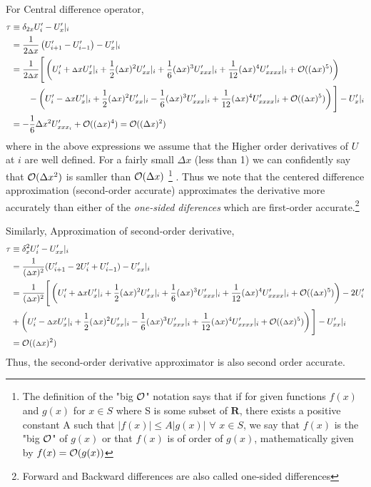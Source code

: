 For Central difference operator,
\begin{align*}
    \tau &\equiv \delta _ {2x} U'_ i - {U'_ x}|_ i \\
    &= \frac{1}{{2 {\scriptstyle \Delta} } x}\left( U'_ {i+1} - U'_{i-1}\right) - {U'_ x}|_i \\
    &= \frac{1}{2 {\scriptstyle \Delta}  x}\Bigg[ \left( U'_ i + {\scriptstyle \Delta} x{U'_ x}|_ i + \frac{1}{2}({\scriptstyle \Delta} x)^2{U'_{xx}}|_ i + \frac{1}{6}({\scriptstyle \Delta} x)^3{U'_{xxx}}|_ i + \frac{1}{12}({\scriptstyle \Delta} x)^4{U'_{xxxx}}|_ i + \mathcal{O}(({\scriptstyle \Delta} x)^5)\right) \\
    &\qquad - \left( U'_ i - {\scriptstyle \Delta} x{U'_ x}|_ i + \frac{1}{2}({\scriptstyle \Delta} x)^2{U'_{xx}}|_ i - \frac{1}{6}({\scriptstyle \Delta} x)^3{U'_{xxx}}|_ i + \frac{1}{12}({\scriptstyle \Delta} x)^4{U'_{xxxx}}|_ i +\mathcal{O}(({\scriptstyle \Delta} x)^5)\right)\Bigg] - {U'_ x}|_ i \\
    &= -\frac{1}{6}\Delta x^2 U'_{xxx_ i} + \mathcal{O}(({\scriptstyle \Delta} x)^4) = \mathcal{O}((\Delta x)^2)
\end{align*}
where in the above expressions we assume that the Higher order derivatives of $U$ at $i$ are well defined. For a fairly small $\Delta x$ (less than 1) we can confidently say that $\mathcal{O}(\Delta x^2)$ is samller than $\mathcal{O}(\Delta x)$%
\footnote{The definition of the "big $\mathcal{O}$" notation says that if for given functions $f(x)$ and $g(x)$ for $x \in S$ where S is some subset of $\mathbf{R}$, there exists a positive constant A such that $|f(x)| \leq A|g(x)|$ $\forall$ $x \in S$, we say that $f(x)$ is the "big $\mathcal{O}$" of $g(x)$ or that $f(x)$ is of order of $g(x)$, mathematically given by $f(x) = \mathcal{O}(g(x))$}%
. Thus we note that the centered difference approximation (second-order accurate) approximates the derivative more accurately than either of the \textit{one-sided diferences} which are first-order accurate.\footnote{Forward and Backward differences are also called one-sided differences}

Similarly, Approximation of second-order derivative,
\begin{align*}
    \tau &\equiv \delta^2_x U'_i - U'_{xx}|_i \\
     &= \frac{1}{({\scriptstyle \Delta} x)^2}(U'_{i+1}-2 U'_i + U'_{i-1})  - U'_{xx}|_i \\
     &= \frac{1}{({\scriptstyle \Delta} x)^2}\Bigg[ \left( U'_ i + {\scriptstyle \Delta} x{U'_ x}|_ i + \frac{1}{2}({\scriptstyle \Delta} x)^2{U'_{xx}}|_ i + \frac{1}{6}({\scriptstyle \Delta} x)^3{U'_{xxx}}|_ i + \frac{1}{12}({\scriptstyle \Delta} x)^4{U'_{xxxx}}|_ i + \mathcal{O}(({\scriptstyle \Delta} x)^5)\right) - 2 U'_i\\
    & + \left( U'_ i - {\scriptstyle \Delta} x{U'_ x}|_ i + \frac{1}{2}({\scriptstyle \Delta} x)^2{U'_{xx}}|_ i - \frac{1}{6}({\scriptstyle \Delta} x)^3{U'_{xxx}}|_ i + \frac{1}{12}({\scriptstyle \Delta} x)^4{U'_{xxxx}}|_ i +\mathcal{O}(({\scriptstyle \Delta} x)^5)\right)\Bigg] - {U'_ {xx}}|_ i \\
    &= \mathcal{O}(({\scriptstyle \Delta} x)^2)
\end{align*}
Thus, the second-order derivative approximator is also second order accurate.

